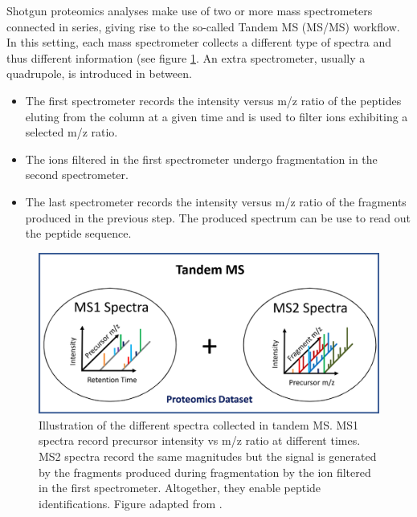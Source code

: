 \documentclass[11pt, a4paper]{report}
\begin{document}

Shotgun proteomics analyses make use of two or more mass spectrometers connected in series, giving rise to the so-called Tandem MS (\ac{MS/MS}) workflow. In this setting, each mass spectrometer collects a different type of spectra and thus different information (see figure \ref{fig:shotgun}. An extra spectrometer, usually a quadrupole, is introduced in between.

\begin{itemize}

\item The first spectrometer records the intensity versus \ac{m/z} ratio of the peptides eluting from the column at a given time and is used to filter ions exhibiting a selected \ac{m/z} ratio.

\item The ions filtered in the first spectrometer undergo fragmentation in the second spectrometer. %

\item The last spectrometer records the intensity versus \ac{m/z} ratio of the fragments produced in the previous step. The produced spectrum can be use to read out the peptide sequence.

\end{itemize}

\begin{figure}[!h]
\centering
\includegraphics[width=\textwidth]{shotgun_adapted}
\caption{Illustration of the different spectra collected in tandem MS. MS1 spectra record precursor intensity vs \ac{m/z} ratio at different times. MS2 spectra record the same magnitudes but the signal is generated by the fragments produced during fragmentation by the ion filtered in the first spectrometer. Altogether, they enable peptide identifications. Figure adapted from \cite{Verheggen2017}.}
\label{fig:shotgun}
\end{figure}
\end{document}
